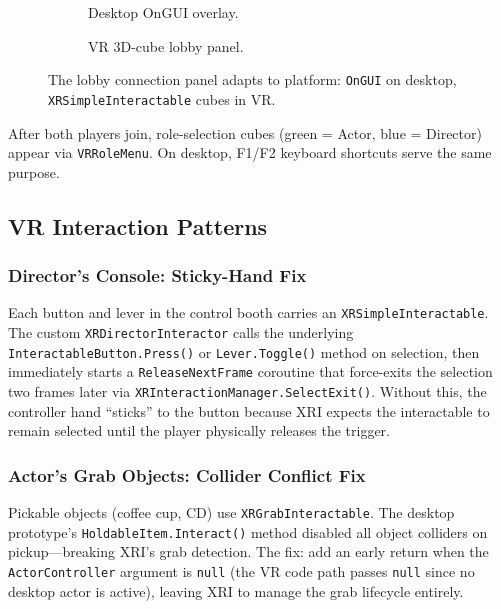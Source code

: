 \documentclass[12pt,a4paper]{article}
\newcommand{\code}[1]{\texttt{#1}}
\begin{document}
\begin{figure}[H]
  \centering
  \begin{subfigure}[b]{0.47\linewidth}
    \caption{Desktop OnGUI overlay.}
  \end{subfigure}
  \hfill
  \begin{subfigure}[b]{0.47\linewidth}
    \caption{VR 3D-cube lobby panel.}
  \end{subfigure}
  \caption{The lobby connection panel adapts to platform: \code{OnGUI} on desktop, \code{XRSimpleInteractable} cubes in VR.}
  \label{fig:lobby}
\end{figure}

After both players join, role-selection cubes (green = Actor, blue = Director) appear via \code{VRRoleMenu}. On desktop, F1/F2 keyboard shortcuts serve the same purpose.

\subsection{VR Interaction Patterns}

\subsubsection{Director's Console: Sticky-Hand Fix}
Each button and lever in the control booth carries an \code{XRSimpleInteractable}. The custom \code{XRDirectorInteractor} calls the underlying \code{InteractableButton.Press()} or \code{Lever.Toggle()} method on selection, then immediately starts a \code{ReleaseNextFrame} coroutine that force-exits the selection two frames later via \code{XRInteractionManager.SelectExit()}. Without this, the controller hand ``sticks'' to the button because XRI expects the interactable to remain selected until the player physically releases the trigger.

\subsubsection{Actor's Grab Objects: Collider Conflict Fix}
Pickable objects (coffee cup, CD) use \code{XRGrabInteractable}. The desktop prototype's \code{HoldableItem.Interact()} method disabled all object colliders on pickup---breaking XRI's grab detection. The fix: add an early return when the \code{ActorController} argument is \code{null} (the VR code path passes \code{null} since no desktop actor is active), leaving XRI to manage the grab lifecycle entirely.
\end{document}
